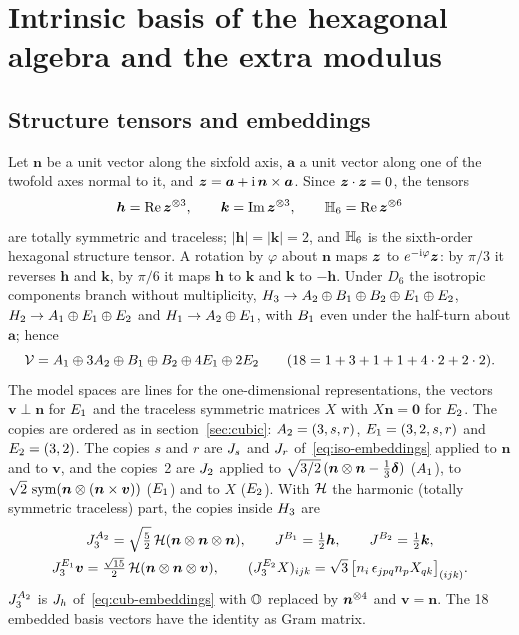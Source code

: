 \section{Intrinsic basis of the hexagonal algebra and the extra modulus}\label{sec:hexagonal}

\subsection{Structure tensors and embeddings}\label{sec:hex-embeddings}

Let $\bm n$ be a unit vector along the sixfold axis, $\bm a$ a unit vector along one of
the twofold axes normal to it, and $\bm{z}=\bm a+\mathrm{i}\,\bm n\times\bm a$. Since
$\bm{z}\cdot\bm{z}=0$, the tensors
\begin{equation}
\bm h=\mathrm{Re}\,\bm{z}^{\otimes3},\qquad \bm k=\mathrm{Im}\,\bm{z}^{\otimes3},\qquad
\mathbb{H}_{6}=\mathrm{Re}\,\bm{z}^{\otimes6}\label{eq:hex-structure}
\end{equation}
are totally symmetric and traceless; $|\bm h|=|\bm k|=2$, and $\mathbb{H}_{6}$ is the
sixth-order hexagonal structure tensor. A rotation by $\varphi$ about $\bm n$ maps $\bm{z}$
to $e^{-\mathrm{i}\varphi}\bm{z}$: by $\pi/3$ it reverses $\bm h$ and $\bm k$, by $\pi/6$ it
maps $\bm h$ to $\bm k$ and $\bm k$ to $-\bm h$. Under $D_6$ the isotropic components
branch without multiplicity, $H_{3}\to A_2\oplus B_1\oplus B_2\oplus
E_1\oplus E_2$, $H_{2}\to A_1\oplus E_1\oplus E_2$ and
$H_{1}\to A_2\oplus E_1$, with $B_1$ even under the half-turn about
$\bm a$; hence
\begin{equation}
\mathcal{V}=A_1\oplus3A_2\oplus B_1\oplus B_2\oplus4E_1\oplus
2E_2\qquad(18=1+3+1+1+4\cdot2+2\cdot2).\label{eq:hex-decomposition}
\end{equation}
The model spaces are lines for the one-dimensional representations, the vectors
$\bm v\perp\bm n$ for $E_1$ and the traceless symmetric matrices $X$ with
$X\bm n=\bm0$ for $E_2$. The copies are ordered as in section~\ref{sec:cubic}:
$A_2=(3,s,r)$, $E_1=(3,2,s,r)$ and $E_2=(3,2)$. The copies $s$ and $r$
are $J_{s}$ and $J_{r}$ of~\eqref{eq:iso-embeddings} applied to $\bm n$ and to
$\bm v$, and the copies~2 are $J_{2}$ applied to $\sqrt{3/2}\,(\bm n\otimes\bm
n-\tfrac13\bm{\delta})$ ($A_1$), to $\sqrt2\,\operatorname{sym}(\bm n\otimes(\bm n\times\bm v))$
($E_1$) and to $X$ ($E_2$). With $\mathcal{H}$ the harmonic (totally symmetric
traceless) part, the copies inside $H_{3}$ are
\begin{equation}
\begin{gathered}
J_{3}^{A_2}=\sqrt{\tfrac52}\,\mathcal{H}(\bm n\otimes\bm n\otimes\bm n),\qquad
J_{}^{B_1}=\tfrac12\bm h,\qquad J_{}^{B_2}=\tfrac12\bm k,\\
J_{3}^{E_1}\bm v=\tfrac{\sqrt{15}}{2}\,\mathcal{H}(\bm n\otimes\bm n\otimes\bm v),\qquad
(J_{3}^{E_2}X)_{ijk}=\sqrt3\,\big[n_i\,\epsilon_{jpq}n_pX_{qk}\big]_{(ijk)}.
\end{gathered}\label{eq:hex-embeddings}
\end{equation}
$J_{3}^{A_2}$ is $J_{h}$ of~\eqref{eq:cub-embeddings} with $\mathbb{O}$ replaced by
$\bm n^{\otimes4}$ and $\bm v=\bm n$. The 18 embedded basis vectors have the identity as
Gram matrix.

